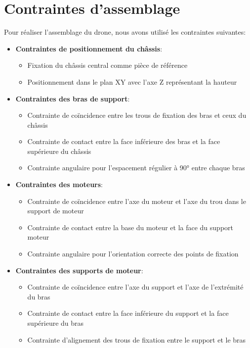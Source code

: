 \documentclass[a4paper,12pt]{report}
\begin{document}
\section{Contraintes d'assemblage}
Pour réaliser l'assemblage du drone, nous avons utilisé les contraintes suivantes:

\begin{itemize}
    \item \textbf{Contraintes de positionnement du châssis}:
    \begin{itemize}
        \item Fixation du châssis central comme pièce de référence
        \item Positionnement dans le plan XY avec l'axe Z représentant la hauteur
    \end{itemize}
    
    \item \textbf{Contraintes des bras de support}:
    \begin{itemize}
        \item Contrainte de coïncidence entre les trous de fixation des bras et ceux du châssis
        \item Contrainte de contact entre la face inférieure des bras et la face supérieure du châssis
        \item Contrainte angulaire pour l'espacement régulier à 90° entre chaque bras
    \end{itemize}
    
    \item \textbf{Contraintes des moteurs}:
    \begin{itemize}
        \item Contrainte de coïncidence entre l'axe du moteur et l'axe du trou dans le support de moteur
        \item Contrainte de contact entre la base du moteur et la face du support moteur
        \item Contrainte angulaire pour l'orientation correcte des points de fixation
    \end{itemize}
    
    \item \textbf{Contraintes des supports de moteur}:
    \begin{itemize}
        \item Contrainte de coïncidence entre l'axe du support et l'axe de l'extrémité du bras
        \item Contrainte de contact entre la face inférieure du support et la face supérieure du bras
        \item Contrainte d'alignement des trous de fixation entre le support et le bras
    \end{itemize}
    

\end{itemize}
\end{document}
